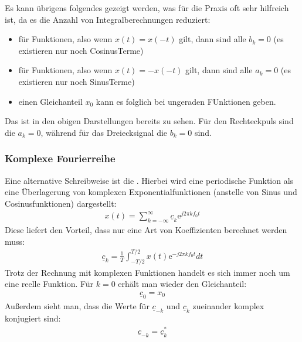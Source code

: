 \documentclass[letterpaper,10pt,english]{jupyterBook}
\begin{document}
\sphinxAtStartPar
Es kann übrigens folgendes gezeigt werden, was für die Praxis oft sehr hilfreich ist, da es die Anzahl von Integralberechnungen reduziert:
\begin{itemize}
\item {} 
\sphinxAtStartPar
für  Funktionen, also wenn \(x(t) = x(-t)\) gilt, dann sind alle \(b_k = 0\) (es existieren nur noch Cosinus\sphinxhyphen{}Terme)

\item {} 
\sphinxAtStartPar
für  Funktionen, also wenn \(x(t) = -x(-t)\) gilt, dann sind alle \(a_k = 0\) (es existieren nur noch Sinus\sphinxhyphen{}Terme)

\item {} 
\sphinxAtStartPar
einen Gleichanteil \(x_0\) kann es folglich bei ungeraden FUnktionen  geben.

\end{itemize}

\sphinxAtStartPar
Das ist in den obigen Darstellungen bereits zu sehen. Für den Rechteckpuls sind die \(a_k = 0\), während für das Dreiecksignal die \(b_k = 0\) sind.


\subsubsection{Komplexe Fourierreihe}
\label{\detokenize{content/3_FourierAnalyse:komplexe-fourierreihe}}
\sphinxAtStartPar
Eine alternative Schreibweise ist die . Hierbei wird eine periodische Funktion als eine Überlagerung von komplexen Exponentialfunktionen (anstelle von Sinus\sphinxhyphen{} und Cosinusfunktionen) dargestellt:
\begin{equation*}
\begin{split}x(t) = \sum_{k=-\infty}^{\infty} \underline{c}_k \mathrm e^{j 2\pi k f_0 t}\end{split}
\end{equation*}
\sphinxAtStartPar
Diese liefert den Vorteil, dass nur eine Art von Koeffizienten berechnet werden muss:
\begin{equation*}
\begin{split}\underline {c}_k = \frac{1}{T}  \int_{-T/2}^{T/2} x(t) \mathrm e^{- j 2\pi k f_0 t} dt \end{split}
\end{equation*}
\sphinxAtStartPar
Trotz der Rechnung mit komplexen Funktionen handelt es sich immer noch um eine reelle Funktion. Für \(k=0\) erhält man wieder den Gleichanteil:
\begin{equation*}
\begin{split}\underline c_0 = x_0\end{split}
\end{equation*}
\sphinxAtStartPar
Außerdem sieht man, dass die Werte für \(\underline {c}_{-k}\) und \(\underline {c}_k\) zueinander komplex konjugiert sind:
\begin{equation*}
\begin{split}\underline {c}_{-k} = \underline {c}_k^*\end{split}
\end{equation*}
\end{document}
